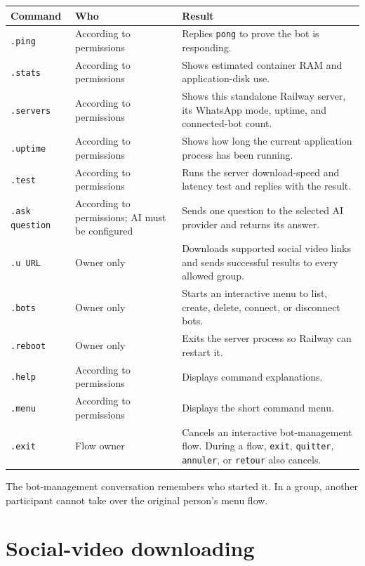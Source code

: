 \documentclass[11pt,a4paper]{article}
\begin{document}
\begin{longtable}{p{}p{}p{}}
\toprule
\textbf{Command} & \textbf{Who} & \textbf{Result}\\
\midrule
\endhead
\texttt{.ping} & According to permissions & Replies \texttt{pong} to prove the bot is responding.\\
\texttt{.stats} & According to permissions & Shows estimated container RAM and application-disk use.\\
\texttt{.servers} & According to permissions & Shows this standalone Railway server, its WhatsApp mode, uptime, and connected-bot count.\\
\texttt{.uptime} & According to permissions & Shows how long the current application process has been running.\\
\texttt{.test} & According to permissions & Runs the server download-speed and latency test and replies with the result.\\
\texttt{.ask question} & According to permissions; AI must be configured & Sends one question to the selected AI provider and returns its answer.\\
\texttt{.u URL} & Owner only & Downloads supported social video links and sends successful results to every allowed group.\\
\texttt{.bots} & Owner only & Starts an interactive menu to list, create, delete, connect, or disconnect bots.\\
\texttt{.reboot} & Owner only & Exits the server process so Railway can restart it.\\
\texttt{.help} & According to permissions & Displays command explanations.\\
\texttt{.menu} & According to permissions & Displays the short command menu.\\
\texttt{.exit} & Flow owner & Cancels an interactive bot-management flow. During a flow, \texttt{exit}, \texttt{quitter}, \texttt{annuler}, or \texttt{retour} also cancels.\\
\bottomrule
\end{longtable}

The bot-management conversation remembers who started it. In a group, another participant cannot take over the original person's menu flow.

\section{Social-video downloading}
\end{document}
